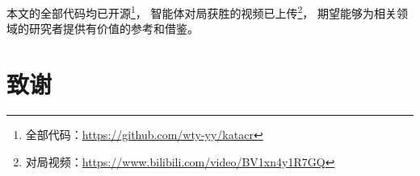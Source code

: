 \documentclass[openany,twoside,nofonts,AutoFakeBold,UTF8]{ctexbook}
\begin{document}
本文的全部代码均已开源\footnote{全部代码：\url{https://github.com/wty-yy/katacr}}，
智能体对局获胜的视频已上传\footnote{对局视频：\url{https://www.bilibili.com/video/BV1xn4y1R7GQ}}，
期望能够为相关领域的研究者提供有价值的参考和借鉴。
\section{致谢}





\end{document}
